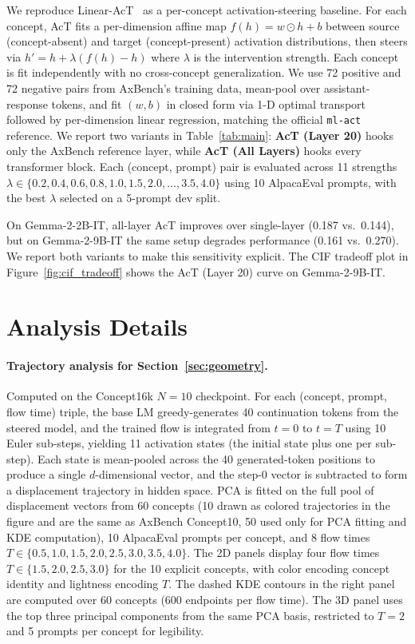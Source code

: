 \documentclass{article}
\begin{document}
We reproduce Linear-AcT~\citep{Rodriguez2024a} as a per-concept activation-steering baseline. For each concept, AcT fits a per-dimension affine map $f(h) = w \odot h + b$ between source (concept-absent) and target (concept-present) activation distributions, then steers via $h' = h + \lambda (f(h) - h)$ where $\lambda$ is the intervention strength. Each concept is fit independently with no cross-concept generalization. We use 72 positive and 72 negative pairs from AxBench's training data, mean-pool over assistant-response tokens, and fit $(w, b)$ in closed form via 1-D optimal transport followed by per-dimension linear regression, matching the official \texttt{ml-act} reference. We report two variants in Table~\ref{tab:main}: \textbf{AcT (Layer 20)} hooks only the AxBench reference layer, while \textbf{AcT (All Layers)} hooks every transformer block. Each (concept, prompt) pair is evaluated across 11 strengths $\lambda \in \{0.2, 0.4, 0.6, 0.8, 1.0, 1.5, 2.0, \ldots, 3.5, 4.0\}$ using 10 AlpacaEval prompts, with the best $\lambda$ selected on a 5-prompt dev split.

On Gemma-2-2B-IT, all-layer AcT improves over single-layer (0.187 vs.\ 0.144), but on Gemma-2-9B-IT the same setup degrades performance (0.161 vs.\ 0.270). We report both variants to make this sensitivity explicit. The CIF tradeoff plot in Figure~\ref{fig:cif_tradeoff} shows the AcT (Layer 20) curve on Gemma-2-9B-IT.

\section{Analysis Details}
\label{app:analysis}

\paragraph{Trajectory analysis for Section~\ref{sec:geometry}.}
Computed on the Concept16k $N\!=\!10$ checkpoint. For each (concept, prompt, flow time) triple, the base LM greedy-generates 40 continuation tokens from the steered model, and the trained flow is integrated from $t\!=\!0$ to $t\!=\!T$ using 10 Euler sub-steps, yielding 11 activation states (the initial state plus one per sub-step). Each state is mean-pooled across the 40 generated-token positions to produce a single $d$-dimensional vector, and the step-0 vector is subtracted to form a displacement trajectory in hidden space. PCA is fitted on the full pool of displacement vectors from 60 concepts (10 drawn as colored trajectories in the figure and are the same as AxBench Concept10, 50 used only for PCA fitting and KDE computation), 10 AlpacaEval prompts per concept, and 8 flow times $T \in \{0.5, 1.0, 1.5, 2.0, 2.5, 3.0, 3.5, 4.0\}$. The 2D panels display four flow times $T \in \{1.5, 2.0, 2.5, 3.0\}$ for the 10 explicit concepts, with color encoding concept identity and lightness encoding $T$. The dashed KDE contours in the right panel are computed over 60 concepts (600 endpoints per flow time). The 3D panel uses the top three principal components from the same PCA basis, restricted to $T\!=\!2$ and 5 prompts per concept for legibility.
\end{document}
